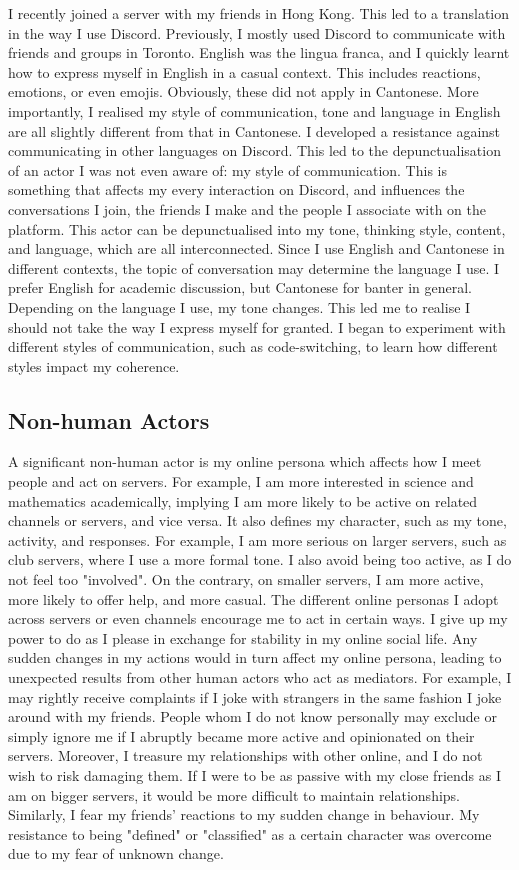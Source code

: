 \documentclass[12pt]{article}
\begin{document}
I recently joined a server with my friends in Hong Kong. This led to a translation in the way I use Discord. Previously, I mostly used Discord to communicate with friends and groups in Toronto. English was the lingua franca, and I quickly learnt how to express myself in English in a casual context. This includes reactions, emotions, or even emojis. Obviously, these did not apply in Cantonese. More importantly, I realised my style of communication, tone and language in English are all slightly different from that in Cantonese. I developed a resistance against communicating in other languages on Discord. This led to the depunctualisation of an actor I was not even aware of: my style of communication. This is something that affects my every interaction on Discord, and influences the conversations I join, the friends I make and the people I associate with on the platform. This actor can be depunctualised into my tone, thinking style, content, and language, which are all interconnected. Since I use English and Cantonese in different contexts, the topic of conversation may determine the language I use. I prefer English for academic discussion, but Cantonese for banter in general. Depending on the language I use, my tone changes. This led me to realise I should not take the way I express myself for granted. I began to experiment with different styles of communication, such as code-switching, to learn how different styles impact my coherence.


\subsection{Non-human Actors}

A significant non-human actor is my online persona which affects how I meet people and act on servers. For example, I am more interested in science and mathematics academically, implying I am more likely to be active on related channels or servers, and vice versa. It also defines my character, such as my tone, activity, and responses. For example, I am more serious on larger servers, such as club servers, where I use a more formal tone. I also avoid being too active, as I do not feel too "involved". On the contrary, on smaller servers, I am more active, more likely to offer help, and more casual. The different online personas I adopt across servers or even channels encourage me to act in certain ways. I give up my power to do as I please in exchange for stability in my online social life. Any sudden changes in my actions would in turn affect my online persona, leading to unexpected results from other human actors who act as mediators. For example, I may rightly receive complaints if I joke with strangers in the same fashion I joke around with my friends. People whom I do not know personally may exclude or simply ignore me if I abruptly became more active and opinionated on their servers. Moreover, I treasure my relationships with other online, and I do not wish to risk damaging them. If I were to be as passive with my close friends as I am on bigger servers, it would be more difficult to maintain relationships. Similarly, I fear my friends' reactions to my sudden change in behaviour. My resistance to being "defined" or "classified" as a certain character was overcome due to my fear of unknown change.
\end{document}
